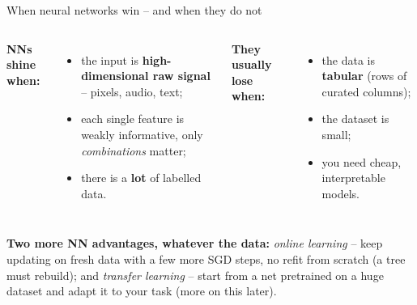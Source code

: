 \documentclass[aspectratio=169]{beamer}
\begin{document}
\begin{frame}{When neural networks win -- and when they do not}
  \begin{columns}[T]
    \textbf{NNs shine when:}
    \begin{itemize}\small
      \item the input is \textbf{high-dimensional raw signal} -- pixels, audio, text;
      \item each single feature is weakly informative, only \emph{combinations} matter;
      \item there is a \textbf{lot} of labelled data.
    \end{itemize}
    \textbf{They usually lose when:}
    \begin{itemize}\small
      \item the data is \textbf{tabular} (rows of curated columns);
      \item the dataset is small;
      \item you need cheap, interpretable models.
    \end{itemize}
  \end{columns}
  \vskip 4pt
  {\small\textbf{Two more NN advantages, whatever the data:} \emph{online learning} -- keep
  updating on fresh data with a few more SGD steps, no refit from scratch (a tree must
  rebuild); and \emph{transfer learning} -- start from a net pretrained on a huge dataset and
  adapt it to your task (more on this later).}
  \vskip 4pt
\end{frame}
\end{document}
